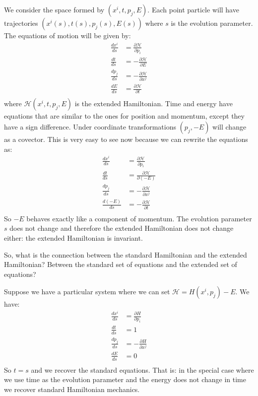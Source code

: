\documentclass[aps,pra,10pt,floatfix,nofootinbib]{revtex4-1}
\theoremstyle{definition}
\begin{document}
We consider the space formed by $(x^i,t,p_j,E)$. Each point particle will have trajectories $(x^i(s),t(s),p_j(s),E(s))$ where $s$ is the evolution parameter. The equations of motion will be given by:
\begin{equation}
\begin{aligned}
\frac{dx^i}{ds} &= \frac{\partial \mathcal{H}}{\partial p_i} \\
\frac{dt}{ds} &= - \frac{\partial \mathcal{H}}{\partial E} \\
\frac{dp_j}{ds} &= - \frac{\partial \mathcal{H}}{\partial x^j} \\
\frac{dE}{ds} &= \frac{\partial \mathcal{H}}{\partial t} \\
\end{aligned}
\label{ExtendedHamilton}
\end{equation}
where $\mathcal{H}(x^i,t,p_j,E)$ is the extended Hamiltonian. Time and energy have equations that are similar to the ones for position and momentum, except they have a sign difference. Under coordinate transformations $(p_j, -E)$ will change as a covector. This is very easy to see now because we can rewrite the equations as:
\begin{equation}
\begin{aligned}
\frac{dx^i}{ds} &= \frac{\partial \mathcal{H}}{\partial p_i} \\
\frac{dt}{ds} &= \frac{\partial \mathcal{H}}{\partial (-E)} \\
\frac{dp_j}{ds} &= - \frac{\partial \mathcal{H}}{\partial x^j} \\
\frac{d(-E)}{ds} &= - \frac{\partial \mathcal{H}}{\partial t} \\
\end{aligned}
\label{ExtendedHamiltonRewritten}
\end{equation}
So $-E$ behaves exactly like a component of momentum. The evolution parameter $s$ does not change and therefore the extended Hamiltonian does not change either: the extended Hamiltonian is invariant.

So, what is the connection between the standard Hamiltonian and the extended Hamiltonian? Between the standard set of equations and the extended set of equations?

Suppose we have a particular system where we can set $\mathcal{H} = H(x^i,p_j) - E$. We have:
\begin{equation}
\begin{aligned}
\frac{dx^i}{ds} &= \frac{\partial H}{\partial p_i} \\
 \frac{dt}{ds} &= 1 \\
\frac{dp_j}{ds} &= - \frac{\partial H}{\partial x^j} \\
 \frac{dE}{ds} &= 0 \\
\end{aligned}
\label{HamiltonRecovered}
\end{equation}
So $t=s$ and we recover the standard equations. That is: in the special case where we use time as the evolution parameter and the energy does not change in time we recover standard Hamiltonian mechanics.
\end{document}
